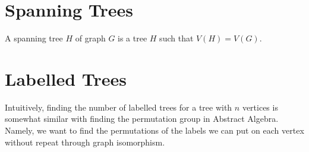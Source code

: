 \section{Spanning Trees}

\begin{definition}
  A spanning tree \(H\) of graph \(G\) is a tree \(H\) such that \(V(H) =
  V(G)\).
\end{definition}

\section{Labelled Trees}

Intuitively, finding the number of labelled trees for a tree with \(n\) vertices
is somewhat similar with finding the permutation group in Abstract Algebra.
Namely, we want to find the permutations of the labels we can put on each vertex
without repeat through graph isomorphism.

